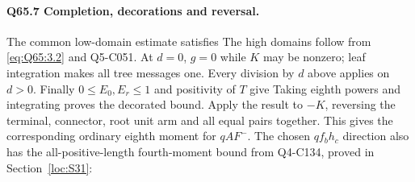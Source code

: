 \paragraph{Q65.7 Completion, decorations and reversal.}
The common low-domain estimate satisfies
The high domains follow from \eqref{eq:Q65:3.2} and Q5-C051.
At \(d=\allowbreak 0\), \(g=\allowbreak 0\) while \(K\) may be nonzero; leaf integration
makes all tree messages one. Every division by \(d\) above applies
on \(d>\allowbreak 0\). Finally \(0\le\allowbreak  E_0,\allowbreak E_r\le\allowbreak 1\) and positivity of \(T\) give
Taking eighth powers and integrating proves the decorated bound.
Apply the result to \(-K\), reversing the terminal, connector, root
unit arm and all equal pairs together. This gives the corresponding
ordinary eighth moment for \(qAF^-\).
The chosen \(qf_bh_c\) direction also has the all-positive-length
fourth-moment bound from Q4-C134, proved in Section~\ref{loc:S31}:
